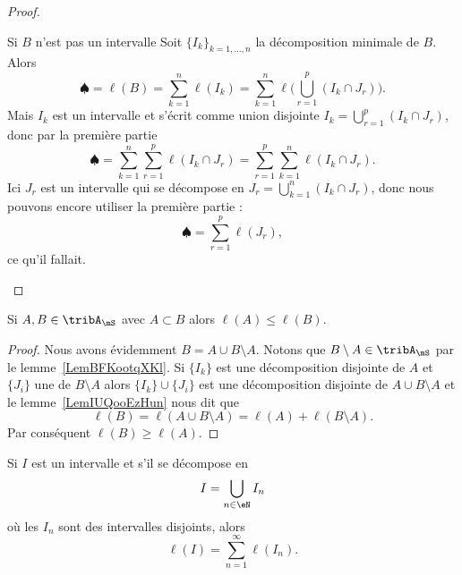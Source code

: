 \begin{proof}
\begin{subproof}
    \item[Si \( B\) n'est pas un intervalle]
        Soit \( \{ I_k \}_{k=1,\ldots, n}\) la décomposition minimale de \( B\). Alors
        \begin{equation}
            \spadesuit=\ell(B)=\sum_{k=1}^n\ell(I_k)=\sum_{k=1}^n\ell\big( \bigcup_{r=1}^p(I_k\cap J_r) \big).
        \end{equation}
        Mais \( I_k\) est un intervalle et s'écrit comme union disjointe \( I_k=\bigcup_{r=1}^p(I_k\cap J_r)\), donc par la première partie
        \begin{equation}
            \spadesuit=\sum_{k=1}^n\sum_{r=1}^p\ell(I_k\cap J_r)=\sum_{r=1}^p\sum_{k=1}^n\ell(I_k\cap J_r).
        \end{equation}
        Ici \( J_r\) est un intervalle qui se décompose en \( J_r=\bigcup_{k=1}^n(I_k\cap J_r)\), donc nous pouvons encore utiliser la première partie :
        \begin{equation}
            \spadesuit=\sum_{r=1}^p\ell(J_r),
        \end{equation}
        ce qu'il fallait.
    \end{subproof}
\end{proof}

\begin{lemma}   \label{LemPIOooRLkbo}
    Si \( A,B\in\tribA_{\mS}\) avec \( A\subset B\) alors \( \ell(A)\leq \ell(B)\).
\end{lemma}

\begin{proof}
    Nous avons évidemment \( B=A\cup B\setminus A\). Notons que \( B\setminus A\in\tribA_{\mS}\) par le lemme~\ref{LemBFKootqXKl}. Si \( \{ I_k \}\) est une décomposition disjointe de \( A\) et \( \{ J_i \}\) une de \( B\setminus A\) alors \( \{ I_k \}\cup\{ J_i \}\) est une décomposition disjointe de \( A\cup B\setminus A\) et le lemme~\ref{LemIUQooEzHun} nous dit que
    \begin{equation}
        \ell(B)=\ell(A\cup B\setminus A)=\ell(A)+\ell(B\setminus A).
    \end{equation}
    Par conséquent \( \ell(B)\geq \ell(A)\).
\end{proof}

\begin{lemma}   \label{LemUMVooZJgMu}
    Si \( I\) est un intervalle et s'il se décompose en
    \begin{equation}
        I=\bigcup_{n\in \eN}I_n
    \end{equation}
    où les \( I_n\) sont des intervalles disjoints, alors
    \begin{equation}
        \ell(I)=\sum_{n=1}^{\infty}\ell(I_n).
    \end{equation}
\end{lemma}


